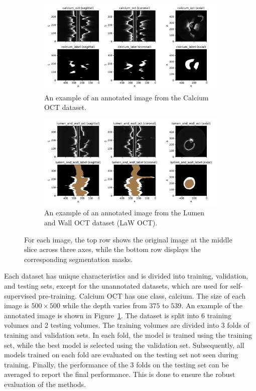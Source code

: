 \documentclass[a4paper,11pt,oneside]{report}
\begin{document}
\begin{figure}[hbt]
    \begin{subfigure}[t]{0.49\textwidth}
        \centering
        \includegraphics[width=1\linewidth]{figures/fig_datasets_calcium_oct_sample.pdf}
        \caption{An example of an annotated image from the Calcium OCT dataset.}
        \label{fig:calcium-oct}
    \end{subfigure}%
    \hfill
    \begin{subfigure}[t]{0.49\textwidth}
        \centering
        \includegraphics[width=1\linewidth]{figures/fig_datasets_law_oct_sample.pdf}
        \caption{An example of an annotated image from the Lumen and Wall OCT dataset (LaW OCT).}
        \label{fig:lumen-and-wall-oct}
    \end{subfigure}
    \caption{For each image, the top row shows the original image at the middle slice across three axes, while the bottom row displays the corresponding segmentation masks.}
    \label{fig:annotated-oct}
\end{figure}

Each dataset has unique characteristics and is divided into training, validation, and testing sets, except for the unannotated datasets, which are used for self-supervised pre-training.
Calcium OCT has one class, calcium. The size of each image is $500\times 500$ while the depth varies from $375$ to $539$. An example of the annotated image is shown in Figure~\ref{fig:calcium-oct}. The dataset is split into 6 training volumes and 2 testing volumes. The training volumes are divided into 3 folds of training and validation sets. In each fold, the model is trained using the training set, while the best model is selected using the validation set. Subsequently, all models trained on each fold are evaluated on the testing set not seen during training. Finally, the performance of the 3 folds on the testing set can be averaged to report the final performance. This is done to ensure the robust evaluation of the methods.
\end{document}
